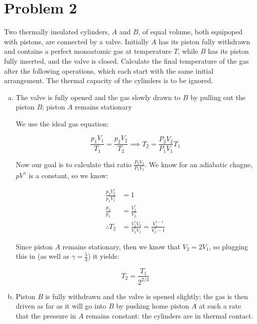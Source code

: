 \documentclass{article}
\begin{document}
\pagebreak
\section*{Problem 2}

Two thermally insulated cylinders, $A$ and $B$, of equal volume, both equipoped with pistons, are connected by a valve. Initially $A$ has its piston fully withdrawn and contains a perfect monoatomic gas at temperature $T$, while $B$ has its piston fully inserted, and the valve is closed. Calculate the final temperature of the gas after the following operations, which each start with the same initial arrangement. The thermal capacity of the cylinders is to be ignored. 

\begin{enumerate}[(a)]
    \item The valve is fully opened and the gas slowly drawn to $B$ by pulling out the piston $B$; piston $A$ remains stationary
    

    \begin{solution}
        We use the ideal gas equation:


        \[\frac{p_1V_1}{T_1} = \frac{p_2V_2}{T_2} \implies T_2 = \frac{P_2V_2}{P_1V_1}T_1\]

        Now our goal is to calculate thsi ratio $\frac{P_2V_2}{P_1V_1}$. We know for an adiabatic chagne, $pV^\gamma$ is a constant, so we know:

        \begin{align*}
            \frac{p_2V_2^\gamma}{p_1V_1^\gamma} &= 1\\
            \frac{p_2}{p_1} &= \frac{V_1^\gamma}{V_2^\gamma}\\
            \therefore T_2 &= \frac{V_1^\gamma V_2}{V_2^\gamma V_1} = \frac{V_1^{\gamma -1}}{V_2^\gamma - 1}
        \end{align*}

        Since piston $A$ remains stationary, then we know that $V_2 = 2V_1$, so plugging this in (as well as $\gamma = \frac{5}{3}$) it yields:

        \[ T_2 = \frac{T_1}{2^{2/3}}\]
         
    \end{solution}
    \item Piston $B$ is fully withdrawn and the valve is opened slightly; the gas is then driven as far as it will go into $B$ by pushing home piston $A$ at such a rate that the pressure in $A$ remains constant: the cylinders are in thermal contact.
    

\end{enumerate}
\end{document}
